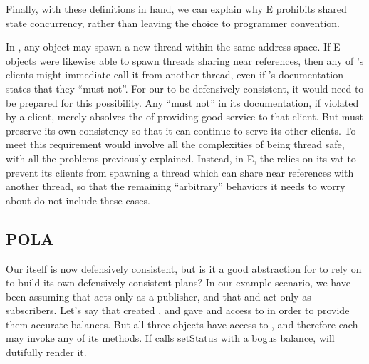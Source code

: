 \documentclass{llncs}
\begin{document}
Finally, with these definitions in hand, we can explain why E
prohibits shared state concurrency, rather than leaving the choice to
programmer convention.

In , any object may spawn a new thread within the same
address space. If E objects were likewise able to spawn threads
sharing near references, then any of 's clients
might immediate-call it from another thread, even if
's documentation states that they ``must not''.
For our  to be defensively consistent, it would
need to be prepared for this possibility. Any ``must not'' in its
documentation, if violated by a client, merely absolves the
 of providing good service to that client. But
 must preserve its own consistency so that it can
continue to serve its other clients. To meet this requirement would
involve all the complexities of being thread safe, with all the
problems previously explained. Instead, in E, the 
relies on its vat to prevent its clients from spawning a thread which
can share near references with another thread, so that the remaining
``arbitrary'' behaviors it needs to worry about do not include these
cases.

\subsection{POLA}

Our  itself is now defensively consistent, but is
it a good abstraction for  to rely on to build its own
defensively consistent plans? In our example scenario, we have been
assuming that  acts only as a publisher, and that 
and  act only as subscribers. Let's say that  created
, and gave  and  access to  in order
to provide them accurate balances.  But all three objects have access
to , and therefore each may invoke any of its methods. If
 calls setStatus with a bogus balance,  will
dutifully render it.
\end{document}

